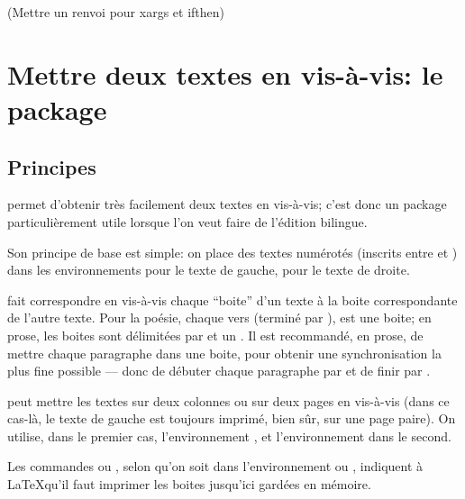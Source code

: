 (Mettre un renvoi pour xargs et ifthen)

 






\section{Mettre deux textes en vis-à-vis: le package }


\subsection{Principes}

 permet d'obtenir très facilement deux textes en vis-à-vis; c'est donc un package particulièrement utile lorsque l'on veut faire de l'édition bilingue.

Son principe de base est simple: on place des textes numérotés (inscrits entre  et ) dans les environnements  pour le texte de gauche,   pour le texte de droite.

 fait correspondre en vis-à-vis chaque \enquote{boite} d'un texte à la boite correspondante de l'autre texte. Pour la poésie,  chaque vers  (terminé par \ampersand ), est une boite;  en prose, les boites sont délimitées par   et un .  Il est recommandé, en prose, de mettre chaque paragraphe dans une boite, pour obtenir une synchronisation la plus fine possible --- donc de débuter chaque paragraphe par  et de finir par . 


 peut mettre les textes sur deux colonnes ou sur deux pages en vis-à-vis (dans ce cas-là, le texte de gauche est toujours imprimé, bien sûr, sur une page paire).
On utilise, dans le premier cas, l'environnement , et l'environnement  dans le second.

Les commandes  ou , selon qu'on soit dans l'environnement  ou , indiquent à \LaTeX qu'il faut imprimer les boites jusqu'ici gardées en mémoire. 



